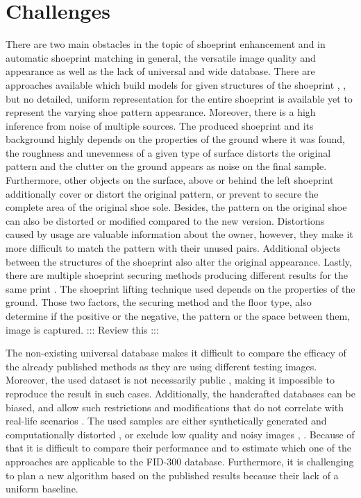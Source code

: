 \documentclass[draft,final]{vutinfth} %
\begin{document}
\section{Challenges}
\par
There are two main obstacles in the topic of shoeprint enhancement and in automatic shoeprint matching in general, the versatile image quality and appearance as well as the lack of universal and wide database.
There are approaches available which build models for given structures of the shoeprint \cite{tang2010footwear}, \cite{alizadeh2017automatic}, but no detailed, uniform representation for the entire shoeprint is available yet to represent the varying shoe pattern appearance.
Moreover, there is a high inference from noise of multiple sources.
The produced shoeprint and its background highly depends on the properties of the ground where it was found, the roughness and unevenness of a given type of surface distorts the original pattern and the clutter on the ground appears as noise on the final sample.
Furthermore, other objects on the surface, above or behind the left shoeprint additionally cover or distort the original pattern, or prevent to secure the complete area of the original shoe sole.
Besides, the pattern on the original shoe can also be distorted or modified compared to the new version.
Distortions caused by usage are valuable information about the owner, however, they make it more difficult to match the pattern with their unused pairs.
Additional objects between the structures of the shoeprint also alter the original appearance.
Lastly, there are multiple shoeprint securing methods producing different results for the same print \cite{katireddy2017novel}. 
The shoeprint lifting technique used depends on the properties of the ground. 
Those two factors, the securing method and the floor type, also determine if the positive or the negative, the pattern or the space between them, image is captured. ::: Review this :::
\par
The non-existing universal database makes it difficult to compare the efficacy of the already published methods as they are using different testing images.
Moreover, the used dataset is not necessarily public \cite{katireddy2017novel}, \cite{dardi2009texture} making it impossible to reproduce the result in such cases.
Additionally, the handcrafted databases can be biased, and allow such restrictions and modifications that do not correlate with real-life scenarios \cite{rida2019forensic}.
The used samples are either synthetically generated and computationally distorted \cite{de2005automated}, \cite{gueham2008automatic} or exclude low quality and noisy images \cite{dardi2009texture}, \cite{tang2010footwear}.
Because of that it is difficult to compare their performance and to estimate which one of the approaches are applicable to the FID-300 database.
Furthermore, it is challenging to plan a new algorithm based on the published results because their lack of a uniform baseline.
\end{document}
